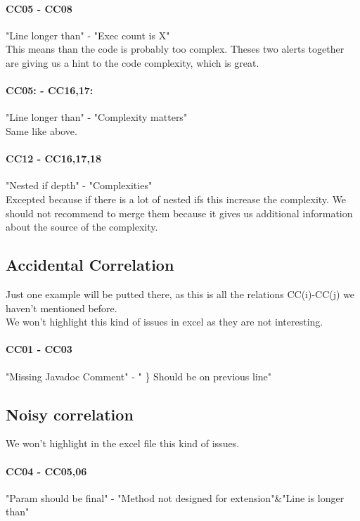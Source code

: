 \documentclass{article}
\begin{document}
\paragraph{CC05  - CC08} 
"Line longer than" - "Exec count is X"  \\
This means than the code is probably too complex. Theses two alerts together are giving us a hint to the code complexity, which is great.
\paragraph{CC05:  - CC16,17:  }
"Line longer than" - "Complexity matters" \\
Same like above.

\paragraph{CC12 - CC16,17,18}
"Nested if depth" - "Complexities" \\
Excepted because if there is a lot of nested ifs this increase the complexity. We should not recommend to merge them because it gives us additional information about the source of the complexity.



\subsection{Accidental Correlation}
Just one example will be putted there, as this is all the relations CC(i)-CC(j) we haven't mentioned before. \\ We won't highlight this kind of issues in excel as they are not interesting.
\paragraph{CC01 - CC03}
"Missing Javadoc Comment" -  " \} Should be on previous line" \\

\subsection{Noisy correlation}
We won't highlight in the excel file this kind of issues.
\paragraph{CC04 - CC05,06}
 "Param should be final" -  "Method not designed for extension"\&"Line is longer than"
\end{document}
